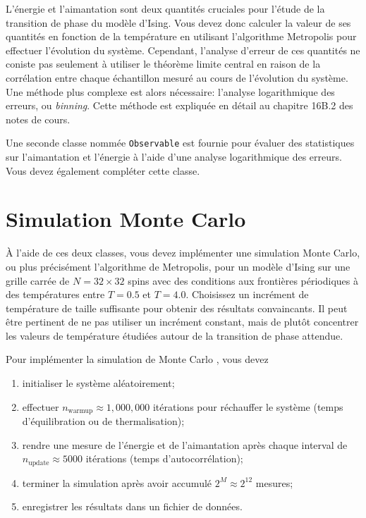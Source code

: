\documentclass[12pt, letterpaper]{article}
\begin{document}
\noindent L'énergie et l'aimantation sont deux quantités cruciales pour l'étude de la transition de phase du modèle d'Ising. Vous devez donc calculer la valeur de ses quantités en fonction de la température en utilisant l'algorithme Metropolis pour effectuer l'évolution du système. Cependant, l'analyse d'erreur de ces quantités ne coniste pas seulement à utiliser le théorème limite central en raison de la corrélation entre chaque échantillon mesuré au cours de l'évolution du système. Une méthode plus complexe est alors nécessaire: l'analyse logarithmique des erreurs, ou \textit{binning}.
Cette méthode est expliquée en détail au chapitre 16B.2 des notes de cours.

\bigskip

\noindent Une seconde classe nommée \texttt{Observable} est fournie pour
évaluer des statistiques sur l'aimantation et l'énergie à l'aide d'une analyse logarithmique des erreurs.
Vous devez également compléter cette classe.

\section{Simulation Monte Carlo}\label{sec:simulation-monte-carlo}

\noindent À l'aide de ces deux classes, vous devez implémenter une simulation Monte Carlo, ou plus précisément l'algorithme de Metropolis,
pour un modèle d'Ising sur une grille carrée de $N=32 \times 32$ spins avec des conditions aux frontières périodiques à des températures entre $T=0.5$ et $T=4.0$.
Choisissez un incrément de température de taille suffisante pour obtenir des résultats convaincants.
Il peut être pertinent de ne pas utiliser un incrément constant, mais de plutôt concentrer les valeurs de température étudiées autour de la transition de phase attendue.

Pour implémenter la simulation de Monte Carlo , vous devez
\begin{enumerate}
	\item initialiser le système aléatoirement;
	\item effectuer $n_{\text{warmup}} \approx 1{,}000{,}000$ itérations pour réchauffer le système (temps d'équilibration ou de thermalisation);
	\item rendre une mesure de l'énergie et de l'aimantation après chaque interval de $n_{\text{update}} \approx 5000$ itérations (temps d'autocorrélation);
	\item terminer la simulation après avoir accumulé $2^{M} \approx 2^{12}$ mesures;
	\item enregistrer les résultats dans un fichier de données.
\end{enumerate}
\end{document}
